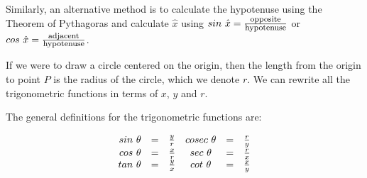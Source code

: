 Similarly, an alternative method is to calculate the hypotenuse using the Theorem of Pythagoras and calculate $\hat{x}$ using $sin~\hat{x} = \frac{\mbox{\footnotesize opposite}}{\mbox{\footnotesize hypotenuse}}$ or $cos~\hat{x} = \frac{\mbox{\footnotesize adjacent}}{\mbox{\footnotesize hypotenuse}}$. \par
If we were to draw a circle centered on the origin, then the length from the origin to point $P$ is the radius of the circle, which we denote $r$. We can rewrite all the trigonometric functions in terms of $x$, $y$ and $r$.



The general definitions for the trigonometric functions are:

\begin{equation*}
\begin{array}{cccccc}\hfill sin~\theta & =& \frac{y}{r}\hfill & cosec~\theta & =& \frac{r}{y}\hfill \\
 \hfill cos~\theta & =& \frac{x}{r}\hfill & sec~\theta & =& \frac{r}{x}\hfill \\
 \hfill tan~\theta & =& \frac{y}{x}\hfill & cot~\theta & =& \frac{x}{y}\hfill \end{array}
\end{equation*}

